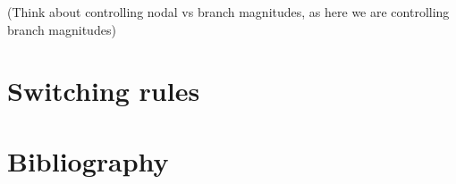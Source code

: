 \documentclass[11pt]{article}
\begin{document}
	(Think about controlling nodal vs branch magnitudes, as here we are controlling branch magnitudes)

	

	\section{Switching rules}

	
	\section{Bibliography}
	\printbibliography
	
\end{document}
